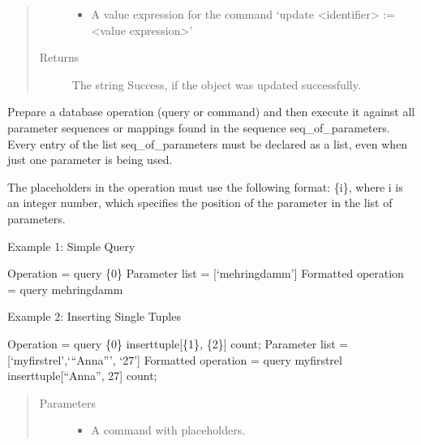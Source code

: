 \documentclass[letterpaper,10pt,english]{sphinxmanual}
\begin{document}
\begin{fulllineitems}
\begin{fulllineitems}
\begin{quote}
\begin{description}
\begin{itemize}
\item {} 
 \textendash{} A value expression for the command ‘update \textless{}identifier\textgreater{} := \textless{}value expression\textgreater{}’

\end{itemize}

\item[{Returns}] \leavevmode
The string Success, if the object was updated successfully.

\end{description}\end{quote}

\end{fulllineitems}


\begin{fulllineitems}
\label{\detokenize{index:secondodb.api.secondoapi.Cursor.executemany}}
Prepare a database operation (query or command) and then execute it against all parameter sequences or mappings
found in the sequence seq\_of\_parameters. Every entry of the list seq\_of\_parameters must be declared as a list,
even when just one parameter is being used.

The placeholders in the operation must use the following format: \{i\}, where i is an integer number, which
specifies the position of the parameter in the list of parameters.

Example 1: Simple Query

Operation = query \{0\}
Parameter list = {[}‘mehringdamm’{]}
Formatted operation = query mehringdamm

Example 2: Inserting Single Tuples

Operation = query \{0\} inserttuple{[}\{1\}, \{2\}{]} count;
Parameter list = {[}‘myfirstrel’,‘“Anna”’, ‘27’{]}
Formatted operation = query myfirstrel inserttuple{[}“Anna”, 27{]} count;
\begin{quote}\begin{description}
\item[{Parameters}] \leavevmode\begin{itemize}
\item {} 
 \textendash{} A  command with placeholders.


\end{itemize}
\end{description}
\end{quote}
\end{fulllineitems}
\end{fulllineitems}
\end{document}
